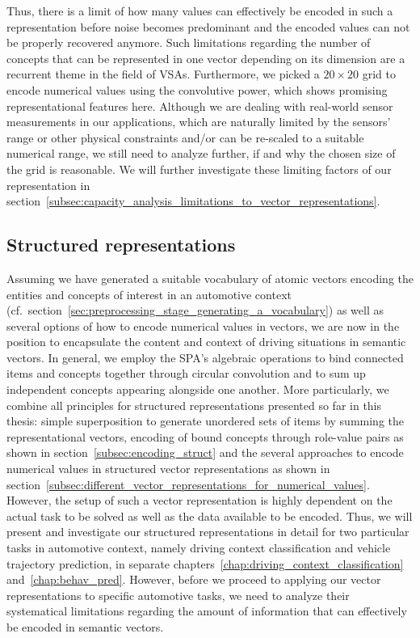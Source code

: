 Thus, there is a limit of how many values can effectively be encoded in such a representation before noise becomes predominant and the encoded values can not be properly recovered anymore.
Such limitations regarding the number of concepts that can be represented in one vector depending on its dimension are a recurrent theme in the field of \acp{VSA}. 
Furthermore, we picked a $20 \times 20$ grid to encode numerical values using the convolutive power, which shows promising representational features here.
Although we are dealing with real-world sensor measurements in our applications, which are naturally limited by the sensors' range or other physical constraints and/or can be re-scaled to a suitable numerical range, we still need to analyze further, if and why the chosen size of the grid is reasonable.
We will further investigate these limiting factors of our representation in section~\ref{subsec:capacity_analysis_limitations_to_vector_representations}.

\subsection{Structured representations}%
\label{subsec:structured_representations}

Assuming we have generated a suitable vocabulary of atomic vectors encoding the entities and concepts of interest in an automotive context (cf.\ section~\ref{sec:preprocessing_stage_generating_a_vocabulary}) as well as several options of how to encode numerical values in vectors, we are now in the position to encapsulate the content and context of driving situations in semantic vectors.
In general, we employ the \ac{SPA}'s algebraic operations to bind connected items and concepts together through circular convolution and to sum up independent concepts appearing alongside one another.
More particularly, we combine all principles for structured representations presented so far in this thesis: simple superposition to generate unordered sets of items by summing the representational vectors, encoding of bound concepts through role-value pairs as shown in section~\ref{subsec:encoding_struct} and the several approaches to encode numerical values in structured vector representations as shown in section~\ref{subsec:different_vector_representations_for_numerical_values}.
However, the setup of such a vector representation is highly dependent on the actual task to be solved as well as the data available to be encoded.
Thus, we will present and investigate our structured representations in detail for two particular tasks in automotive context, namely driving context classification and vehicle trajectory prediction, in separate chapters~\ref{chap:driving_context_classification} and~\ref{chap:behav_pred}.
However, before we proceed to applying our vector representations to specific automotive tasks, we need to analyze their systematical limitations regarding the amount of information that can effectively be encoded in semantic vectors.

